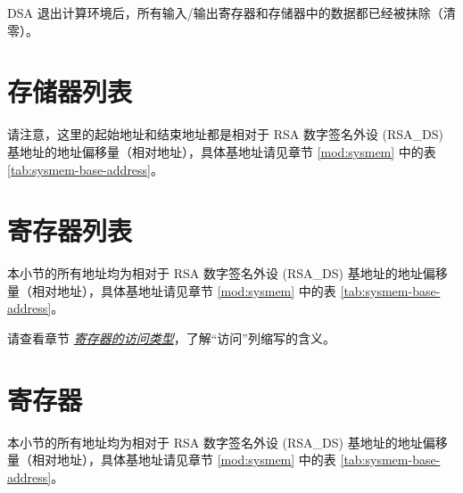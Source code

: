 \documentclass[main\_\_CN.tex]{subfiles}
\begin{document}
DSA 退出计算环境后，所有输入/输出寄存器和存储器中的数据都已经被抹除（清零）。



\newpage
\section{ 存储器列表 }
\label{sec:digsig-mem-summ}

请注意，这里的起始地址和结束地址都是相对于 RSA 数字签名外设 (RSA\_DS) 基地址的地址偏移量（相对地址），具体基地址请见章节 \ref{mod:sysmem} \textit{} 中的表 \ref{tab:sysmem-base-address}。






\newpage
\hypertarget{digsig-reg-summ}{}
\section{寄存器列表}
\label{sec:digsig-reg-summ}

本小节的所有地址均为相对于 RSA 数字签名外设 (RSA\_DS) 基地址的地址偏移量（相对地址），具体基地址请见章节 \ref{mod:sysmem} \textit{} 中的表 \ref{tab:sysmem-base-address}。

请查看章节 \hyperref[glossary-access-types]{\textit{寄存器的访问类型}}，了解“访问”列缩写的含义。






\newpage
\section{寄存器}

本小节的所有地址均为相对于 RSA 数字签名外设 (RSA\_DS) 基地址的地址偏移量（相对地址），具体基地址请见章节 \ref{mod:sysmem} \textit{} 中的表 \ref{tab:sysmem-base-address}。


\end{document}
